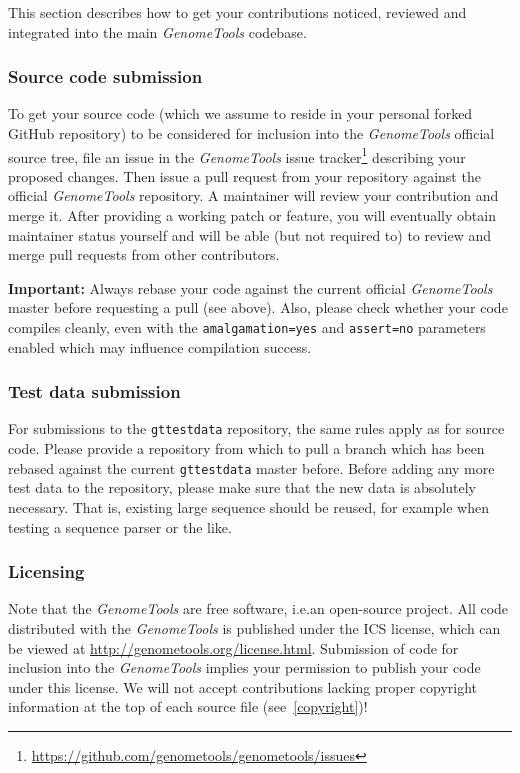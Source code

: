 \documentclass[11pt,final]{article}
\newcommand{\keyword}[1]{\lstinline{#1}}
\newcommand{\Gt}[0]{\emph{GenomeTools}\xspace}
\begin{document}
This section describes how to get your contributions noticed, reviewed and
integrated into the main \Gt codebase.

\subsubsection{Source code submission}

To get your source code (which we assume to reside in your personal forked
GitHub repository) to be considered for inclusion into the \Gt official source
tree, file an issue in the \Gt issue
tracker\footnote{\url{https://github.com/genometools/genometools/issues}}
describing your proposed changes. Then issue a pull request from your
repository against the official \Gt repository. A maintainer will review your
contribution and merge it. After providing a working patch or feature, you will
eventually obtain maintainer status yourself and will be able (but not required
to) to review and merge pull requests from other contributors.

\textbf{Important:} Always rebase your code against the current
official \Gt master before requesting a pull (see above). Also, please check
whether your code compiles cleanly, even with the \keyword{amalgamation=yes}
and \keyword{assert=no} parameters enabled which may influence compilation
success.

\subsubsection{Test data submission}

For submissions to the \keyword{gttestdata} repository, the same rules apply
as for source code. Please provide a repository from which to pull a branch
which has been rebased against the current \keyword{gttestdata} master before.
Before adding any more test data to the repository, please make sure that
the new data is absolutely necessary. That is, existing large sequence should be
reused, for example when testing a sequence parser or the like.

\subsubsection{Licensing}

Note that the \Gt are free software, i.e.\@ an open-source project.
All code distributed with the \Gt is published under the ICS license,
which can be viewed at \url{http://genometools.org/license.html}. Submission of
code for inclusion into the \Gt implies your permission to publish your code
under this license. We will not accept contributions lacking proper
copyright information at the top of each source file (see~\ref{copyright})!
\end{document}
